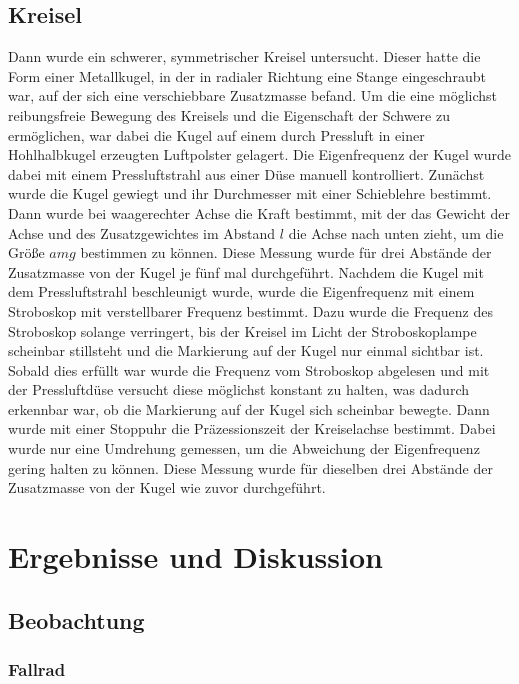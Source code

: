 \documentclass[
	a4paper,
	12pt,
	pagesize,
	ngerman
]{scrartcl}
\begin{document}
	\subsection{Kreisel}
	Dann wurde ein schwerer, symmetrischer Kreisel untersucht.
	Dieser hatte die Form einer Metallkugel, in der in radialer Richtung eine Stange eingeschraubt war, auf der sich eine verschiebbare Zusatzmasse befand.
	Um die eine möglichst reibungsfreie Bewegung des Kreisels und die Eigenschaft der Schwere zu ermöglichen, war dabei die Kugel auf einem durch Pressluft in einer Hohlhalbkugel erzeugten Luftpolster gelagert.
	Die Eigenfrequenz der Kugel wurde dabei mit einem Pressluftstrahl aus einer Düse manuell kontrolliert.
	Zunächst wurde die Kugel gewiegt und ihr Durchmesser mit einer Schieblehre bestimmt.
	Dann wurde bei waagerechter Achse die Kraft bestimmt, mit der das Gewicht der Achse und des Zusatzgewichtes im Abstand $ l $ die Achse nach unten zieht, um die Größe $ amg$ bestimmen zu können.%
	Diese Messung wurde für drei Abstände der Zusatzmasse von der Kugel je fünf mal durchgeführt.
	Nachdem die Kugel mit dem Pressluftstrahl beschleunigt wurde, wurde die Eigenfrequenz mit einem Stroboskop mit verstellbarer Frequenz bestimmt.
	Dazu wurde die Frequenz des Stroboskop solange verringert, bis der Kreisel im Licht der Stroboskoplampe scheinbar stillsteht und die Markierung auf der Kugel nur einmal sichtbar ist.
	Sobald dies erfüllt war wurde die Frequenz vom Stroboskop abgelesen und mit der Pressluftdüse versucht diese möglichst konstant zu halten, was dadurch erkennbar war, ob die Markierung auf der Kugel sich scheinbar bewegte.
	Dann wurde mit einer Stoppuhr die Präzessionszeit der Kreiselachse bestimmt.
	Dabei wurde nur eine Umdrehung gemessen, um die Abweichung der Eigenfrequenz gering halten zu können.
	Diese Messung wurde für dieselben drei Abstände der Zusatzmasse von der Kugel wie zuvor durchgeführt.
	
	
	\section{Ergebnisse und Diskussion}
	

	\subsection{Beobachtung}
	\subsubsection{Fallrad}
\end{document}
